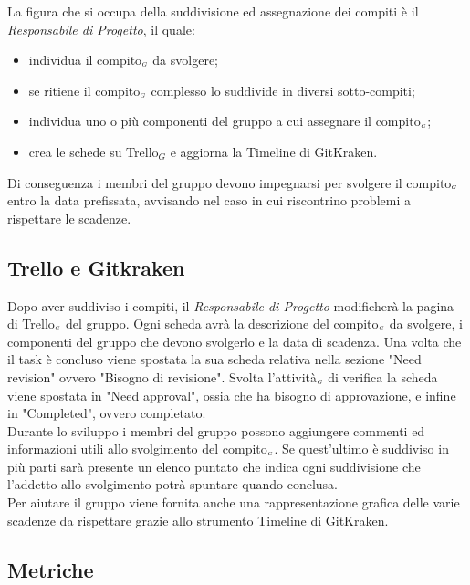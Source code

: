 La figura che si occupa della suddivisione ed assegnazione dei compiti è il \textit{Responsabile di Progetto}, il quale:
\begin{itemize}
	\item individua il compito$_{\scaleto{G}{3pt}}$ da svolgere;
	\item se ritiene il compito$_{\scaleto{G}{3pt}}$ complesso lo suddivide in diversi sotto-compiti;
	\item individua uno o più componenti del gruppo a cui assegnare il compito$_{\scaleto{G}{3pt}}$;
	\item crea le schede su Trello$_G$ e aggiorna la Timeline di GitKraken.
\end{itemize}

Di conseguenza i membri del gruppo devono impegnarsi per svolgere il compito$_{\scaleto{G}{3pt}}$ entro la data prefissata, avvisando nel caso in cui riscontrino problemi a rispettare le scadenze.

\subsection{Trello e Gitkraken}\label{ProcessiOrganizzativiProcessoDiPianificazioneTrelloEGitkraken}

Dopo aver suddiviso i compiti, il \textit{Responsabile di Progetto} modificherà la pagina di Trello$_{\scaleto{G}{3pt}}$ del gruppo. Ogni scheda avrà la descrizione del compito$_{\scaleto{G}{3pt}}$ da svolgere, i componenti del gruppo che devono svolgerlo e la data di scadenza.
Una volta che il task è concluso viene spostata la sua scheda relativa nella sezione "Need revision" ovvero "Bisogno di revisione".
Svolta l'attività$_{\scaleto{G}{3pt}}$ di verifica la scheda viene spostata in "Need approval", ossia che ha bisogno di approvazione, e infine in "Completed", ovvero completato.\\
Durante lo sviluppo i membri del gruppo possono aggiungere commenti ed informazioni utili allo svolgimento del compito$_{\scaleto{G}{3pt}}$. Se quest'ultimo è suddiviso in più parti sarà presente un elenco puntato che indica ogni suddivisione che l'addetto allo svolgimento potrà spuntare quando conclusa. \\
Per aiutare il gruppo viene fornita anche una rappresentazione grafica delle varie scadenze da rispettare grazie allo strumento Timeline di GitKraken.

\subsection{Metriche}\label{ProcessiOrganizzativiProcessoDiPianificazioneMetriche}

